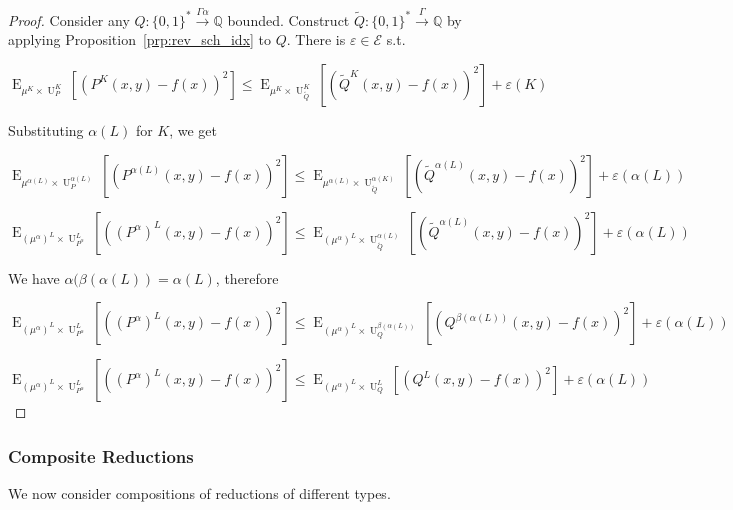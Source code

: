 \documentclass{article}
\numberwithin{equation}{section}
\theoremstyle{definition}
\theoremstyle{plain}
\newcommand{\Bool}{\{0,1\}}
\newcommand{\Words}{{\Bool^*}}
\DeclareMathOperator{\E}{E}
\DeclareMathOperator{\Un}{U}
\newcommand{\Rats}{\mathbb{Q}}
\newcommand{\Fall}{\mathcal{E}}
\newcommand{\Scheme}{\xrightarrow{\Gamma}}
\begin{document}
\begin{proof}

Consider any ${Q: \Words \xrightarrow{\Gamma \alpha} \Rats}$ bounded. Construct ${\tilde{Q}: \Words \Scheme \Rats}$ by applying Proposition~\ref{prp:rev_sch_idx} to ${Q}$. There is ${\varepsilon \in \Fall}$ s.t.

\[\E_{\mu^{K} \times \Un_P^K}[(P^K(x,y)-f(x))^2] \leq \E_{\mu^{K} \times \Un_{\tilde{Q}}^K}[(\tilde{Q}^K(x,y)-f(x))^2] + \varepsilon(K)\]

Substituting ${\alpha(L)}$ for ${K}$, we get

\[\E_{\mu^{\alpha(L)} \times \Un_P^{\alpha(L)}}[(P^{\alpha(L)}(x,y)-f(x))^2] \leq \E_{\mu^{\alpha(L)} \times \Un_{\tilde{Q}}^{\alpha(K)}}[(\tilde{Q}^{\alpha(L)}(x,y)-f(x))^2] + \varepsilon({\alpha(L)})\]

\[\E_{(\mu^\alpha)^{L} \times \Un_{P^\alpha}^L}[((P^\alpha)^L(x,y)-f(x))^2] \leq \E_{(\mu^\alpha)^{L} \times \Un_{\tilde{Q}}^{\alpha(L)}}[(\tilde{Q}^{\alpha(L)}(x,y)-f(x))^2] + \varepsilon(\alpha(L))\]

We have ${\alpha(\beta(\alpha(L))=\alpha(L)}$, therefore

\[\E_{(\mu^\alpha)^{L} \times \Un_{P^\alpha}^L}[((P^\alpha)^L(x,y)-f(x))^2] \leq \E_{(\mu^\alpha)^{L} \times \Un_Q^{\beta(\alpha(L))}}[(Q^{\beta(\alpha(L))}(x,y)-f(x))^2] + \varepsilon(\alpha(L))\]

\[\E_{(\mu^\alpha)^{L} \times \Un_{P^\alpha}^L}[((P^\alpha)^L(x,y)-f(x))^2] \leq \E_{(\mu^\alpha)^{L} \times \Un_Q^L}[(Q^L(x,y)-f(x))^2] + \varepsilon(\alpha(L))\]
%
\end{proof}

\subsubsection{Composite Reductions}

We now consider compositions of reductions of different types.

\end{document}

